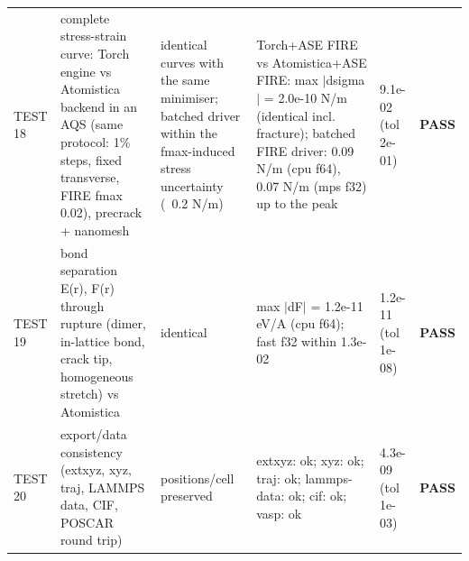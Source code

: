 \begin{longtable}{>{\raggedright\arraybackslash}p{1.1cm}>{\raggedright\arraybackslash}p{4.4cm}>{\raggedright\arraybackslash}p{2.7cm}>{\raggedright\arraybackslash}p{4.1cm}>{\raggedright\arraybackslash}p{1.2cm}p{0.9cm}}
TEST 18 & complete stress-strain curve: Torch engine vs Atomistica backend in an AQS (same protocol: 1\% steps, fixed transverse, FIRE fmax 0.02), precrack + nanomesh & identical curves with the same minimiser; batched driver within the fmax-induced stress uncertainty (~0.2 N/m) & Torch+ASE FIRE vs Atomistica+ASE FIRE: max $|$dsigma$|$ = 2.0e-10 N/m (identical incl. fracture); batched FIRE driver: 0.09 N/m (cpu f64), 0.07 N/m (mps f32) up to the peak & 9.1e-02 (tol 2e-01) & \textbf{PASS}\\
TEST 19 & bond separation E(r), F(r) through rupture (dimer, in-lattice bond, crack tip, homogeneous stretch) vs Atomistica & identical & max $|$dF$|$ = 1.2e-11 eV/A (cpu f64); fast f32 within 1.3e-02 & 1.2e-11 (tol 1e-08) & \textbf{PASS}\\
TEST 20 & export/data consistency (extxyz, xyz, traj, LAMMPS data, CIF, POSCAR round trip) & positions/cell preserved & extxyz: ok; xyz: ok; traj: ok; lammps-data: ok; cif: ok; vasp: ok & 4.3e-09 (tol 1e-03) & \textbf{PASS}\\
\bottomrule\end{longtable}\endgroup